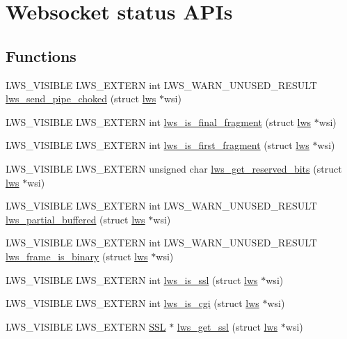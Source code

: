 \hypertarget{group__wsstatus}{}\section{Websocket status A\+P\+Is}
\label{group__wsstatus}
\subsection*{Functions}
\begin{DoxyCompactItemize}
\item 
L\+W\+S\+\_\+\+V\+I\+S\+I\+B\+LE L\+W\+S\+\_\+\+E\+X\+T\+E\+RN int L\+W\+S\+\_\+\+W\+A\+R\+N\+\_\+\+U\+N\+U\+S\+E\+D\+\_\+\+R\+E\+S\+U\+LT \hyperlink{group__wsstatus_ga2bb3655329b4651cd06f79ee3a764421}{lws\+\_\+send\+\_\+pipe\+\_\+choked} (struct \hyperlink{structlws}{lws} $\ast$wsi)
\item 
L\+W\+S\+\_\+\+V\+I\+S\+I\+B\+LE L\+W\+S\+\_\+\+E\+X\+T\+E\+RN int \hyperlink{group__wsstatus_ga08e9ee165fca503fd9427d55cfecac37}{lws\+\_\+is\+\_\+final\+\_\+fragment} (struct \hyperlink{structlws}{lws} $\ast$wsi)
\item 
L\+W\+S\+\_\+\+V\+I\+S\+I\+B\+LE L\+W\+S\+\_\+\+E\+X\+T\+E\+RN int \hyperlink{group__wsstatus_gaa931caf68b8efb5dc148ae94e54cbd51}{lws\+\_\+is\+\_\+first\+\_\+fragment} (struct \hyperlink{structlws}{lws} $\ast$wsi)
\item 
L\+W\+S\+\_\+\+V\+I\+S\+I\+B\+LE L\+W\+S\+\_\+\+E\+X\+T\+E\+RN unsigned char \hyperlink{group__wsstatus_ga3df5045656dfb6b0e63a38de2dca79d2}{lws\+\_\+get\+\_\+reserved\+\_\+bits} (struct \hyperlink{structlws}{lws} $\ast$wsi)
\item 
L\+W\+S\+\_\+\+V\+I\+S\+I\+B\+LE L\+W\+S\+\_\+\+E\+X\+T\+E\+RN int L\+W\+S\+\_\+\+W\+A\+R\+N\+\_\+\+U\+N\+U\+S\+E\+D\+\_\+\+R\+E\+S\+U\+LT \hyperlink{group__wsstatus_gaeca4afc94b1f026034f99cbba37e2f85}{lws\+\_\+partial\+\_\+buffered} (struct \hyperlink{structlws}{lws} $\ast$wsi)
\item 
L\+W\+S\+\_\+\+V\+I\+S\+I\+B\+LE L\+W\+S\+\_\+\+E\+X\+T\+E\+RN int L\+W\+S\+\_\+\+W\+A\+R\+N\+\_\+\+U\+N\+U\+S\+E\+D\+\_\+\+R\+E\+S\+U\+LT \hyperlink{group__wsstatus_gaccd9c59336efad8af0554f79cc5966fd}{lws\+\_\+frame\+\_\+is\+\_\+binary} (struct \hyperlink{structlws}{lws} $\ast$wsi)
\item 
L\+W\+S\+\_\+\+V\+I\+S\+I\+B\+LE L\+W\+S\+\_\+\+E\+X\+T\+E\+RN int \hyperlink{group__wsstatus_ga26a140623d202dd2bf2004deb6994baa}{lws\+\_\+is\+\_\+ssl} (struct \hyperlink{structlws}{lws} $\ast$wsi)
\item 
L\+W\+S\+\_\+\+V\+I\+S\+I\+B\+LE L\+W\+S\+\_\+\+E\+X\+T\+E\+RN int \hyperlink{group__wsstatus_ga4ad226d5e01024b4046f4a5a37199aa1}{lws\+\_\+is\+\_\+cgi} (struct \hyperlink{structlws}{lws} $\ast$wsi)
\item 
L\+W\+S\+\_\+\+V\+I\+S\+I\+B\+LE L\+W\+S\+\_\+\+E\+X\+T\+E\+RN \hyperlink{structssl__st}{S\+SL} $\ast$ \hyperlink{group__wsstatus_ga24192f5500a3e1702de1652fa8dda10b}{lws\+\_\+get\+\_\+ssl} (struct \hyperlink{structlws}{lws} $\ast$wsi)
\end{DoxyCompactItemize}


